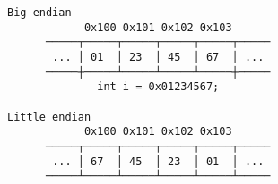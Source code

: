 \documentclass[varwidth,crop]{standalone}
\begin{document}
\begin{verbatim}
Big endian
            0x100 0x101 0x102 0x103
      ─────┬─────┬─────┬─────┬─────┬─────
       ... │ 01  │ 23  │ 45  │ 67  │ ... 
      ─────┼─────┴─────┴─────┴─────┼─────
              int i = 0x01234567;

Little endian
            0x100 0x101 0x102 0x103
      ─────┬─────┬─────┬─────┬─────┬─────
       ... │ 67  │ 45  │ 23  │ 01  │ ... 
      ─────┴─────┴─────┴─────┴─────┴─────
\end{verbatim}
\end{document}
